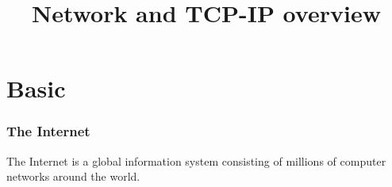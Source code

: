 \documentclass{../UTNetLab}
\title{Network and TCP-IP overview}
\begin{document}
\part{Basic}
    \section{The Internet}
    The Internet is a global information system consisting of millions of computer networks around the world.
\end{document}
